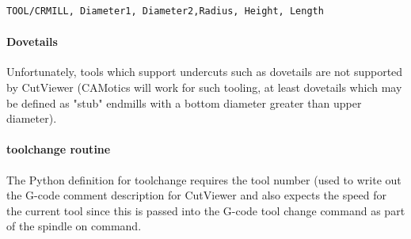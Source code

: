 \documentclass{ltxdoc}
\begin{document}
\begin{verbatim}
TOOL/CRMILL, Diameter1, Diameter2,Radius, Height, Length
\end{verbatim}

\paragraph{Dovetails}

Unfortunately, tools which support undercuts such as dovetails are not supported by CutViewer (CAMotics will work for such tooling, at least dovetails which may be defined as "stub" endmills with a bottom diameter greater than upper diameter).

\paragraph{toolchange routine}

The Python definition for toolchange requires the tool number (used to write out the G-code comment description for CutViewer and also expects the speed for the current tool since this is passed into the G-code tool change command as part of the spindle on command.
\end{document}
